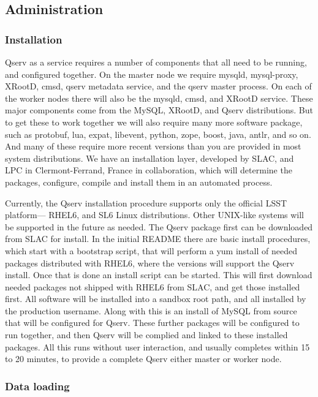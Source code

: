 \documentclass[DM,lsstdraft,toc]{lsstdoc}
\begin{document}
\subsection{Administration}\label{administration}

\subsubsection{Installation}\label{installation}

Qserv as a service requires a number of components that all need to be
running, and configured together. On the master node we require mysqld,
mysql-proxy, XRootD, cmsd, qserv metadata
service, and the qserv master process. On each of the worker nodes there
will also be the mysqld, cmsd, and XRootD
service. These major components come from the MySQL,
XRootD, and Qserv distributions. But to get
these to work together we will also require many more software package,
such as protobuf, lua, expat, libevent, python, zope, boost, java,
antlr, and so on. And many of these require more recent versions than
you are provided in most system distributions. We have an installation
layer, developed by SLAC, and LPC in Clermont-Ferrand, France in
collaboration, which will determine the packages, configure, compile and
install them in an automated process.

Currently, the Qserv installation procedure supports only the official
LSST platform--- RHEL6, and SL6 Linux distributions. Other UNIX-like
systems will be supported in the future as needed. The Qserv package
first can be downloaded from SLAC for install. In the initial README
there are basic install procedures, which start with a bootstrap script,
that will perform a yum install of needed packages distributed with
RHEL6, where the versions will support the Qserv install. Once that is
done an install script can be started. This will first download needed
packages not shipped with RHEL6 from SLAC, and get those installed
first. All software will be installed into a sandbox root path, and all
installed by the production username. Along with this is an install of
MySQL from source that will be configured for Qserv. These further
packages will be configured to run together, and then Qserv will be
complied and linked to these installed packages. All this runs without
user interaction, and usually completes within 15 to 20 minutes, to
provide a complete Qserv either master or worker node.

\subsubsection{Data loading}\label{data-loading}
\end{document}
